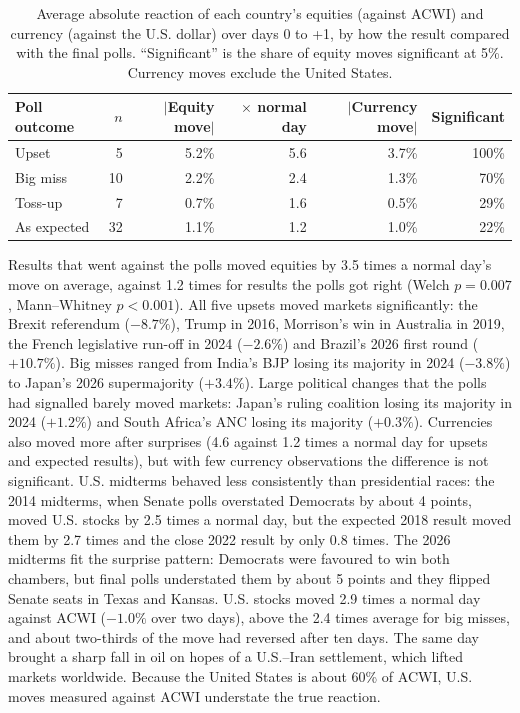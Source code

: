 \documentclass[11pt]{article}
\begin{document}
\begin{table}[h]
\centering\small
\begin{tabular}{lrrrrr}
\toprule
Poll outcome & $n$ & $|$Equity move$|$ & $\times$ normal day & $|$Currency move$|$ & Significant \\
\midrule
Upset        & 5  & 5.2\% & 5.6 & 3.7\% & 100\% \\
Big miss     & 10 & 2.2\% & 2.4 & 1.3\% & 70\% \\
Toss-up      & 7  & 0.7\% & 1.6 & 0.5\% & 29\% \\
As expected  & 32 & 1.1\% & 1.2 & 1.0\% & 22\% \\
\bottomrule
\end{tabular}
\caption{Average absolute reaction of each country's equities (against ACWI) and currency (against the U.S. dollar) over days 0 to +1, by how the result compared with the final polls. ``Significant'' is the share of equity moves significant at 5\%. Currency moves exclude the United States.}
\label{tab:surprise}
\end{table}

Results that went against the polls moved equities by 3.5 times a normal day's move on average, against 1.2 times for results the polls got right (Welch $p = 0.007$, Mann--Whitney $p < 0.001$). All five upsets moved markets significantly: the Brexit referendum ($-8.7\%$), Trump in 2016, Morrison's win in Australia in 2019, the French legislative run-off in 2024 ($-2.6\%$) and Brazil's 2026 first round ($+10.7\%$). Big misses ranged from India's BJP losing its majority in 2024 ($-3.8\%$) to Japan's 2026 supermajority ($+3.4\%$). Large political changes that the polls had signalled barely moved markets: Japan's ruling coalition losing its majority in 2024 ($+1.2\%$) and South Africa's ANC losing its majority ($+0.3\%$). Currencies also moved more after surprises (4.6 against 1.2 times a normal day for upsets and expected results), but with few currency observations the difference is not significant. U.S. midterms behaved less consistently than presidential races: the 2014 midterms, when Senate polls overstated Democrats by about 4 points, moved U.S. stocks by 2.5 times a normal day, but the expected 2018 result moved them by 2.7 times and the close 2022 result by only 0.8 times. The 2026 midterms fit the surprise pattern: Democrats were favoured to win both chambers, but final polls understated them by about 5 points and they flipped Senate seats in Texas and Kansas. U.S. stocks moved 2.9 times a normal day against ACWI ($-1.0\%$ over two days), above the 2.4 times average for big misses, and about two-thirds of the move had reversed after ten days. The same day brought a sharp fall in oil on hopes of a U.S.--Iran settlement, which lifted markets worldwide. Because the United States is about 60\% of ACWI, U.S. moves measured against ACWI understate the true reaction.
\end{document}

